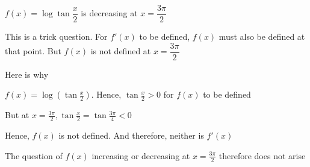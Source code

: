 \documentclass[14pt,fleqn]{extarticle}
\newcommand\fx{\log \tan \dfrac{x}{2}}
\begin{document}
 
\begin{snippet}
    
    \incorrect
    
    $f(x) = \fx$ is decreasing at $x=\dfrac{3\pi}{2}$
    
    
    \reason
    
    This is a trick question. For $f'(x)$ to be defined, $f(x)$ must also be defined 
    at that point. But $f(x)$ is not defined at $x=\dfrac{3\pi}{2}$\newline 
    
    Here is why \newline 
    
    $f(x) = \log \left(\tan\frac{x}{2} \right)$. Hence, $\tan\frac{x}{2} > 0$ for $f(x)$ to be defined \newline 
    
    But at $x = \frac{3\pi}{2}, \tan\frac{x}{2} = \tan\frac{3\pi}{4} < 0$\newline 
    
    Hence, $f(x)$ is not defined. And therefore, neither is $f'(x)$\newline 
    
    The question of $f(x)$ increasing or decreasing at $x=\frac{3\pi}{2}$ therefore does not arise  

    
    
\end{snippet} 
\end{document}
